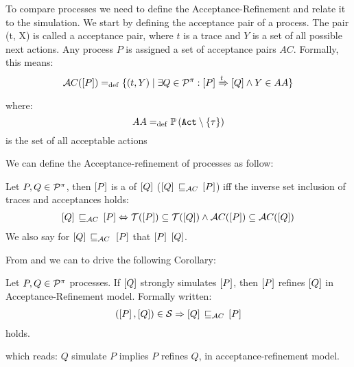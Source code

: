To compare \picalc{} processes we need to define the Acceptance-Refinement and relate it to the simulation. We start by defining the acceptance pair of a process.
The pair (t, X) is called a acceptance pair, where $t$ is a trace and $Y$ is a set of all possible next actions. Any process
$P$ is assigned a set of acceptance pairs $AC$. Formally, this means:
\begin{align}
    \accepatances[P] \define \{(t,Y) \mid \exists Q\in\procs: \ec{P} \bigstep{t} \ec{Q}\wedge Y\in AA\}
\label{failure}
\end{align}
where: \[AA \define \pom{\actions\setminus\set{\tau}}\] is the set of all acceptable actions

We can define the Acceptance-refinement of \picalc{} processes as follow:

\begin{definition}
\label{def_failure_ref}
	Let $P,Q\in\mathcal P^{\pi}$, then $\left[P\right]$ is a  of $\left[Q\right]$ ($\ec{Q}\refiAC \ec{P}$) iff the inverse set inclusion of traces and acceptances holds:
\begin{align}
   \ec{Q} \refiAC \ec{P} \Leftrightarrow  \traces[P]\subseteq\traces[Q] \wedge \accepatances[P]\subseteq\accepatances[Q]
\end{align}
	We also say for $\ec{Q}\refiAC{}\ec{P}$ that $\left[P\right]$  $\left[Q\right]$.
\end{definition}

From  and  we can to drive the following Corollary: 

\begin{cor}
\label{cor_sim_acceptance_refinement}
Let $P,Q\in\mathcal P^{\pi}$ processes. If $\left[Q\right]$ strongly simulates $\left[P\right]$, then $\left[P\right]$ refines $\left[Q\right]$ in Acceptance-Refinement model. Formally written:
\begin{align}
    (\ec{P},\ec{Q})\in{}\simu \Rightarrow \ec{Q} \refiAC \ec{P}
   \label{acceptance_model}
\end{align}
holds.
\end{cor}%
which reads: $Q$ simulate $P$ implies $P$ refines $Q$, in acceptance-refinement model.

